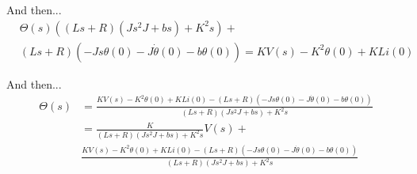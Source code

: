 And then...
\begin{align*}
	& \Theta(s)((Ls+R)(Js^2 J +bs)+K^2s) + \\
	& (Ls+R)(-Js\theta (0) - J\dot{\theta} (0) -b\theta (0)) = KV(s) - K^2 \theta (0) +KLi(0)
\end{align*}

And then...
\begin{align*}
	\Theta(s) &= \frac{KV(s) - K^2 \theta (0) +KLi(0) - (Ls+R)(-Js\theta (0) - J\dot{\theta} (0) -b\theta (0))}{(Ls+R)(Js^2 J +bs)+K^2s} \\
			  &= \frac{K}{(Ls+R)(Js^2 J +bs)+K^2s}V(s) + \\
	          &\frac{KV(s) - K^2 \theta (0) +KLi(0) - (Ls+R)(-Js\theta (0) - J\dot{\theta} (0) -b\theta (0))}{(Ls+R)(Js^2 J +bs)+K^2s}
\end{align*}
